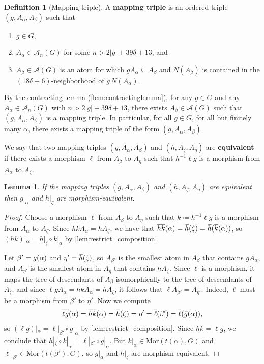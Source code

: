 \documentclass[11pt,letterpaper]{amsart}
\newtheorem{lemma}[theorem]{Lemma}
\theoremstyle{definition}
\newtheorem{definition}[theorem]{Definition}
\newcommand{\newword}[1]{\textbf{#1}}
\newcommand{\A}{\mathcal{A}}
\newcommand{\og}{\mkern 2mu\overline{\mkern-2mu g\mkern0.5mu}\mkern-0.5mu}
\newcommand{\oh}{\mkern 2mu\overline{\mkern-2mu h\mkern-0.25mu}\mkern 0.25mu}
\begin{document}
\begin{definition}[Mapping triple]
A \newword{mapping triple} is an ordered triple $(g,A_\alpha,A_\beta)$ such that
\begin{enumerate}
    \item $g\in G$,\smallskip
    \item $A_\alpha\in \A_n(G)$ for some $n>2|g|+39\delta+13$, and\smallskip
    \item $A_\beta\in \A(G)$ is an atom for which $gA_\alpha\subseteq A_\beta$ and $N(A_\beta)$ is contained in the $(18\delta+6)$-neighborhood of $g\,N(A_\alpha)$.
\end{enumerate}
\end{definition}
By the contracting lemma (\cref{lem:contractinglemma}), for any $g\in G$ and any $A_\alpha\in \A_n(G)$ with $n>2|g|+39\delta+13$, there exists $A_\beta\in\A(G)$ such that $(g,A_\alpha,A_\beta)$ is a mapping triple. In particular, for all $g\in G$, for all but finitely many $\alpha$, there exists a mapping triple of the form $(g,A_\alpha,A_\beta)$.

We say that two mapping triples $(g,A_\alpha,A_\beta)$ and $(h,A_\zeta,A_\eta)$ are \newword{equivalent} if there exists a morphism $\ell$ from $A_\beta$ to $A_\eta$ such that $h^{-1}\ell g$ is a morphism from $A_\alpha$ to $A_\zeta$.

\begin{lemma}\label{lem:mapping_triples_equiv}
If the mapping triples $(g,A_\alpha,A_\beta)$ and $(h,A_\zeta,A_\eta)$ are equivalent then $g|_\alpha$ and $h|_\zeta$ are morphism-equivalent.
\end{lemma}

\begin{proof}
Choose a morphism $\ell$ from $A_\beta$ to $A_\eta$ such that $k\coloneqq h^{-1}\ell g$ is a morphism from $A_\alpha$ to $A_\zeta$.  Since $hkA_\alpha = hA_\zeta$, we have that $\overline{hk}(\alpha) = \oh(\zeta) = \oh(\overline{k}(\alpha))$, so $(hk)|_\alpha = h|_\zeta \circ k|_\alpha$ by \cref{lem:restrict_composition}.

Let $\beta'=\og(\alpha)$ and $\eta'=\oh(\zeta)$, so $A_{\beta'}$ is the smallest atom in $A_\beta$ that contains $gA_\alpha$, and $A_{\eta'}$ is the smallest atom in $A_\eta$ that contains $hA_\zeta$.  Since $\ell$ is a morphism, it maps the tree of descendants of $A_\beta$ isomorphically to the tree of descendants of $A_\zeta$, and since $\ell g A_\alpha = hk A_\alpha = h A_\zeta$, it follows that $\ell A_{\beta'}=A_{\eta'}$.  Indeed, $\ell$ must be a morphism from $\beta'$ to $\eta'$.  Now we compute 
\[
\overline{\ell g}(\alpha) = \overline{hk}(\alpha) = 
\oh(\zeta) =
\eta' =
\overline{\ell}(\beta') =
\overline{\ell}(\og(\alpha)),
\]
so $(\ell g)|_\alpha = \ell|_{\beta'}\circ g|_\alpha$ by \cref{lem:restrict_composition}.  Since $hk=\ell g$, we conclude that  $h|_\zeta \circ k|_\alpha = \ell|_{\beta'}\circ g|_\alpha$. But $k|_\alpha \in \mathrm{Mor}(t(\alpha),G)$ and $\ell|_{\beta'}\in \mathrm{Mor}(t(\beta'),G)$, so $g|_\alpha$ and $h|_\zeta$ are morphism-equivalent.
\end{proof}
\end{document}
